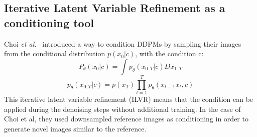 \documentclass[journal=jacsat,manuscript=article]{achemso}
\begin{document}
\subsection{Iterative Latent Variable Refinement as a conditioning tool}
Choi \textit{et al.}~\cite{choi2021ilvr} introduced a way to condition DDPMs by sampling their images from the conditional distribution $p(x_0|c)$, with the condition c:
\begin{equation}
    P_\theta(x_0|c) = \int p_\theta(x_{0:T}|c)Dx_{1:T}
\end{equation}
\begin{equation}
    p_{\theta}(x_{0:T}|c)=p(x_T)\prod_{t=1}^{T}p_{\theta}(x_{t-1}x_t,c)
\end{equation}
This iterative latent variable refinement (ILVR) means that the condition can be applied during the denoising steps without additional training. In the case of Choi et al, they used downsampled reference images as conditioning in order to generate novel images similar to the reference. 

\end{document}

